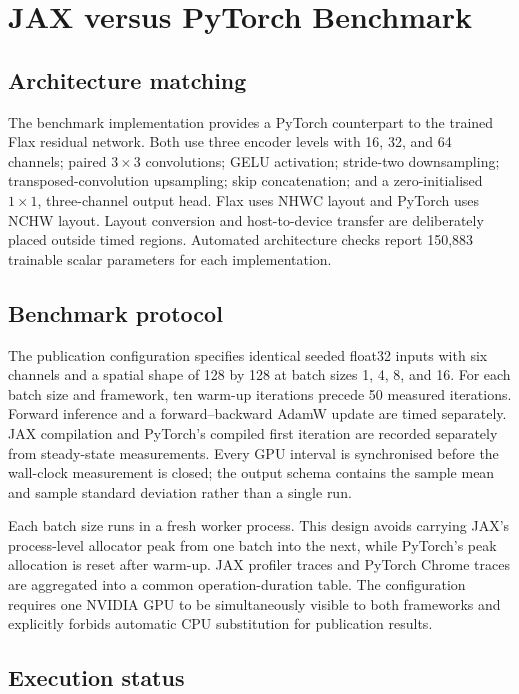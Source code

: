 \section{JAX versus PyTorch Benchmark}
\label{sec:jax-vs-pytorch}

\subsection{Architecture matching}

The benchmark implementation provides a PyTorch counterpart to the trained
Flax residual network.  Both use three encoder levels with 16, 32, and 64
channels; paired \(3\times3\) convolutions; GELU activation; stride-two
downsampling; transposed-convolution upsampling; skip concatenation; and a
zero-initialised \(1\times1\), three-channel output head.  Flax uses NHWC
layout and PyTorch uses NCHW layout.  Layout conversion and host-to-device
transfer are deliberately placed outside timed regions.  Automated
architecture checks report 150,883 trainable scalar parameters for each
implementation.

\subsection{Benchmark protocol}

The publication configuration specifies identical seeded float32 inputs with
six channels and a spatial shape of 128 by 128 at batch sizes 1, 4, 8, and
16.  For each batch size and framework, ten warm-up iterations precede 50
measured iterations.  Forward inference and a forward--backward AdamW update
are timed separately.  JAX compilation and PyTorch's compiled first iteration
are recorded separately from steady-state measurements.  Every GPU interval
is synchronised before the wall-clock measurement is closed; the output schema
contains the sample mean and sample standard deviation rather than a single
run.

Each batch size runs in a fresh worker process.  This design avoids carrying
JAX's process-level allocator peak from one batch into the next, while
PyTorch's peak allocation is reset after warm-up.  JAX profiler traces and
PyTorch Chrome traces are aggregated into a common operation-duration table.
The configuration requires one NVIDIA GPU to be simultaneously visible to
both frameworks and explicitly forbids automatic CPU substitution for
publication results.

\subsection{Execution status}

